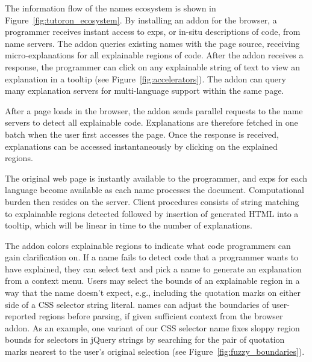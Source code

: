 The information flow of the \Glspl{name} ecosystem is shown in Figure~\ref{fig:tutoron_ecosystem}.
By installing an addon for the browser, a programmer receives instant access to \glspl{exp}, or in-situ descriptions of code, from \Gls{name} servers.
The addon queries existing \Glspl{name} with the page source, receiving micro-explanations for all explainable regions of code.
After the addon receives a response, the programmer can click on any explainable string of text to view an explanation in a tooltip (see Figure~\ref{fig:accelerators}).
The addon can query many explanation servers for multi-language support within the same page.


\begin{changes}
After a page loads in the browser, the addon sends parallel requests to the \Gls{name} servers to detect all explainable code.
Explanations are therefore fetched in one batch when the user first accesses the page.
Once the response is received, explanations can be accessed instantaneously by clicking on the explained regions.
\end{changes}
The original web page is instantly available to the programmer, and \glspl{exp} for each language become available as each \Gls{name} processes the document.
Computational burden then resides on the server.
 Client procedures consists of string matching to explainable regions detected followed by insertion of generated HTML into a tooltip, which will be linear in time to the number of explanations.\fi

\begin{changes}
The addon colors explainable regions to indicate what code programmers can gain clarification on.
If a \Gls{name} fails to detect code that a programmer wants to have explained, they can select text and pick a \Gls{name} to generate an explanation from a context menu.
Users may select the bounds of an explainable region in a way that the \Gls{name} doesn't expect, e.g., including the quotation marks on either side of a CSS selector string literal.
\Glspl{name} can adjust the boundaries of user-reported regions before parsing, if given sufficient context from the browser addon.
As an example, one variant of our CSS selector \Gls{name} fixes sloppy region bounds for selectors in jQuery strings by searching for the pair of quotation marks nearest to the user's original selection (see Figure~\ref{fig:fuzzy_boundaries}).

\end{changes}
  \fi


